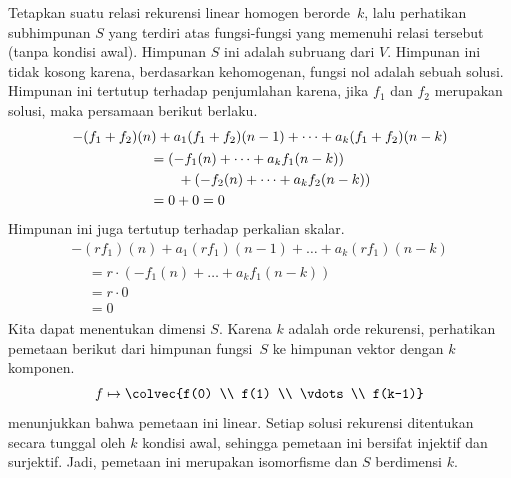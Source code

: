 Tetapkan suatu relasi rekurensi linear homogen berorde~$k$, lalu perhatikan
subhimpunan $S$ yang terdiri atas fungsi-fungsi yang memenuhi relasi tersebut
(tanpa kondisi awal).
Himpunan $S$ ini adalah subruang dari $V$.
Himpunan ini tidak kosong karena, berdasarkan kehomogenan, fungsi nol adalah
sebuah solusi.
Himpunan ini tertutup terhadap penjumlahan karena, jika $f_1$ dan $f_2$
merupakan solusi, maka persamaan berikut berlaku.
\begin{multline*}
  -(f_1+f_2)(n)+a_1(f_1+f_2)(n-1)+\dots+a_k(f_1+f_2)(n-k) \\  
  \begin{aligned}
    &=(-f_1(n)+\dots+a_kf_1(n-k))          \\
    &\qquad\hbox{}+(-f_2(n)+\dots+a_kf_2(n-k))     \\
    &=0+0=0
  \end{aligned}
\end{multline*}
Himpunan ini juga tertutup terhadap perkalian skalar.
\begin{multline*}
  -(rf_1)(n)+a_1(rf_1)(n-1)+\dots+a_k(rf_1)(n-k) \\  
  \begin{aligned}
    &=r\cdot (-f_1(n)+\dots+a_kf_1(n-k))   \\
    &=r\cdot 0                                    \\
    &=0
  \end{aligned}
\end{multline*}
Kita dapat menentukan dimensi $S$.
Karena $k$ adalah orde rekurensi, perhatikan pemetaan berikut dari himpunan
fungsi~$S$ ke himpunan vektor dengan $k$ komponen.
\begin{equation*}
  f 
  \mapsto 
  \colvec{f(0) \\ f(1) \\ \vdots \\ f(k-1)}
\end{equation*}
 menunjukkan bahwa pemetaan ini linear.
Setiap solusi rekurensi ditentukan secara tunggal oleh $k$ kondisi awal,
sehingga pemetaan ini bersifat injektif dan surjektif.
Jadi, pemetaan ini merupakan isomorfisme dan $S$ berdimensi $k$.

